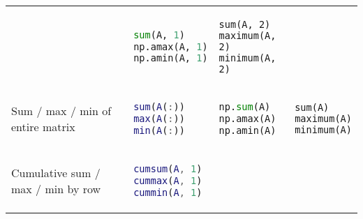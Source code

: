 \documentclass[]{article}
\begin{document}
\begin{longtable}[]{@{}llll@{}}
\begin{minipage}[t]{0.22\columnwidth}
\begin{lstlisting}[language=Matlab]
\end{lstlisting}
\strut
\end{minipage} & \begin{minipage}[t]{0.24\columnwidth}\raggedright\strut
\begin{lstlisting}[language=Python]
sum(A, 1)
np.amax(A, 1)
np.amin(A, 1)
\end{lstlisting}
\strut
\end{minipage} & \begin{minipage}[t]{0.20\columnwidth}\raggedright\strut
\begin{lstlisting}
sum(A, 2)
maximum(A, 2)
minimum(A, 2)
\end{lstlisting}
\strut
\end{minipage}\tabularnewline
\begin{minipage}[t]{0.23\columnwidth}\raggedright\strut
Sum / max / min of entire matrix\strut
\end{minipage} & \begin{minipage}[t]{0.22\columnwidth}\raggedright\strut
\begin{lstlisting}[language=Matlab]
sum(A(:))
max(A(:))
min(A(:))
\end{lstlisting}
\strut
\end{minipage} & \begin{minipage}[t]{0.24\columnwidth}\raggedright\strut
\begin{lstlisting}[language=Python]
np.sum(A)
np.amax(A)
np.amin(A)
\end{lstlisting}
\strut
\end{minipage} & \begin{minipage}[t]{0.20\columnwidth}\raggedright\strut
\begin{lstlisting}
sum(A)
maximum(A)
minimum(A)
\end{lstlisting}
\strut
\end{minipage}\tabularnewline
\begin{minipage}[t]{0.23\columnwidth}\raggedright\strut
Cumulative sum / max / min by row\strut
\end{minipage} & \begin{minipage}[t]{0.22\columnwidth}\raggedright\strut
\begin{lstlisting}[language=Matlab]
cumsum(A, 1)
cummax(A, 1)
cummin(A, 1)
\end{lstlisting}
\strut
\end{minipage} & \begin{minipage}[t]{0.24\columnwidth}\raggedright\strut
\begin{lstlisting}[language=Python]

\end{lstlisting}
\end{minipage}
\end{longtable}
\end{document}
